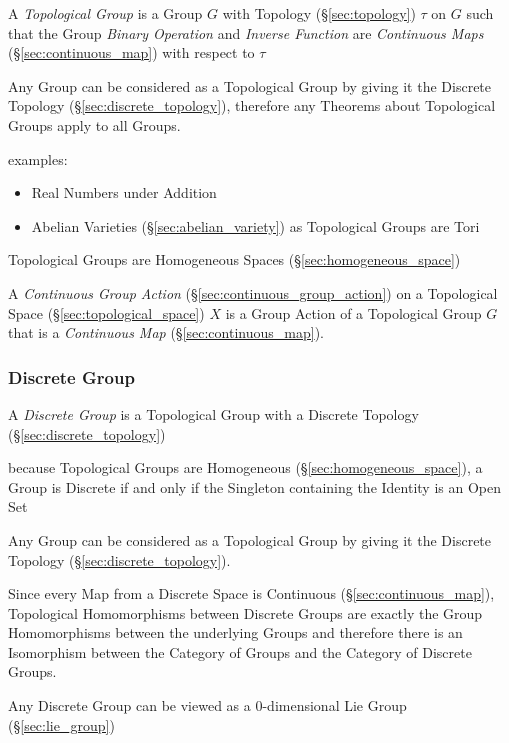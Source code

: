 \begin{itemize}
A \emph{Topological Group} is a Group $G$ with Topology (\S\ref{sec:topology})
$\tau$ on $G$ such that the Group \emph{Binary Operation} and \emph{Inverse
  Function} are \emph{Continuous Maps} (\S\ref{sec:continuous_map})
with respect to $\tau$

Any Group can be considered as a Topological Group by giving it the Discrete
Topology (\S\ref{sec:discrete_topology}), therefore any Theorems about
Topological Groups apply to all Groups.

examples:
\begin{itemize}
  \item Real Numbers under Addition
  \item Abelian Varieties (\S\ref{sec:abelian_variety}) as Topological Groups
    are Tori %
\end{itemize}

Topological Groups are Homogeneous Spaces (\S\ref{sec:homogeneous_space})

A \emph{Continuous Group Action} (\S\ref{sec:continuous_group_action}) on a
Topological Space (\S\ref{sec:topological_space}) $X$ is a Group Action of a
Topological Group $G$ that is a \emph{Continuous Map}
(\S\ref{sec:continuous_map}).



\subsubsection{Discrete Group}\label{sec:discrete_group}

A \emph{Discrete Group} is a Topological Group with a Discrete Topology
(\S\ref{sec:discrete_topology})

because Topological Groups are Homogeneous (\S\ref{sec:homogeneous_space}), a
Group is Discrete if and only if the Singleton containing the Identity is an
Open Set

Any Group can be considered as a Topological Group by giving it the Discrete
Topology (\S\ref{sec:discrete_topology}).

Since every Map from a Discrete Space is Continuous
(\S\ref{sec:continuous_map}), Topological Homomorphisms between Discrete Groups
are exactly the Group Homomorphisms between the underlying Groups and therefore
there is an Isomorphism between the Category of Groups and the Category of
Discrete Groups.

Any Discrete Group can be viewed as a $0$-dimensional Lie Group
(\S\ref{sec:lie_group}) %


\end{itemize}
